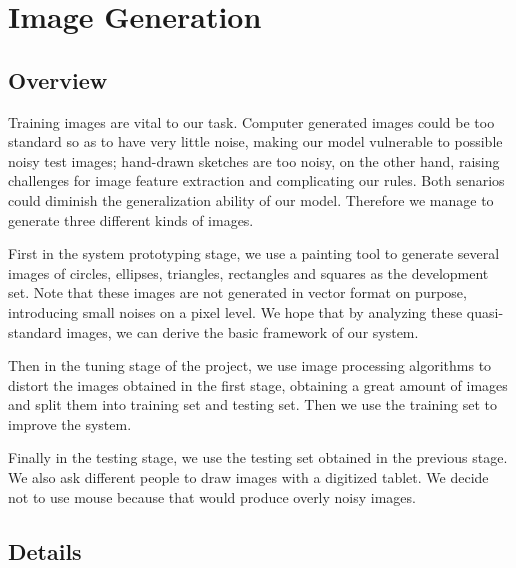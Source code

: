 \section{Image Generation}

\subsection{Overview}

Training images are vital to our task. Computer generated images could be too standard so as to have very little noise, making our model vulnerable to possible noisy test images; hand-drawn sketches are too noisy, on the other hand, raising challenges for image feature extraction and complicating our rules. Both senarios could diminish the generalization ability of our model. Therefore we manage to generate three different kinds of images.

First in the system prototyping stage, we use a painting tool to generate several images of circles, ellipses, triangles, rectangles and squares as the development set. Note that these images are not generated in vector format on purpose, introducing small noises on a pixel level. We hope that by analyzing these quasi-standard images, we can derive the basic framework of our system.

Then in the tuning stage of the project, we use image processing algorithms to distort the images obtained in the first stage, obtaining a great amount of images and split them into training set and testing set. Then we use the training set to improve the system.

Finally in the testing stage, we use the testing set obtained in the previous stage. We also ask different people to draw images with a digitized tablet. We decide not to use mouse because that would produce overly noisy images.

\subsection{Details}

